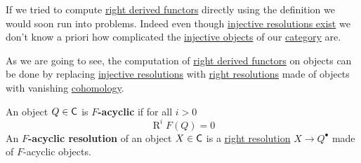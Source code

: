 \documentclass[../../main]{subfiles}
\begin{document}
If we tried to compute \hyperref[def:right-derived-functor]{right derived functors} directly using the definition we would soon run into problems.
Indeed even though \hyperref[thm:existence-injective-resolution]{injective resolutions exist} we don't know a priori how complicated the \hyperref[def:injective-projective-object]{injective objects} of our \hyperref[def:category]{category} are.

As we are going to see, the computation of \hyperref[def:right-derived-functor]{right derived functors} on objects can be done by replacing \hyperref[def:resolution]{injective resolutions} with \hyperref[def:resolution]{right resolutions} made of objects with vanishing \hyperref[def:cohomology]{cohomology}.
\begin{definition}\label{def:F-acyclic-object}
  An object \(Q \in \mathsf{C}\) is \textbf{\(F\)-acyclic} if for all \(i > 0\)
  \begin{equation*}
    \operatorname{R}^{i}F(Q) = 0
  \end{equation*}
  An \textbf{\(F\)-acyclic resolution} of an object \(X \in \mathsf{C}\) is a \hyperref[def:resolution]{right resolution} \(X \to Q^{\bullet}\) made of \(F\)-acyclic objects.
\end{definition}
\end{document}
